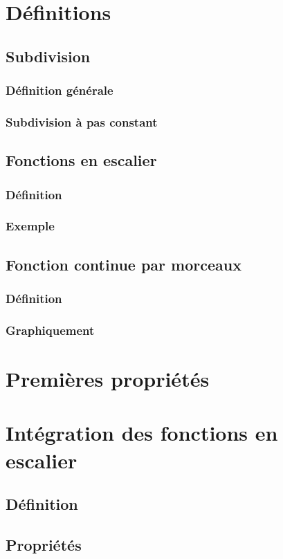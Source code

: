 \documentclass[12pt,a4paper,french]{book}
\begin{document}
	\section{Définitions}
		\subsection{Subdivision}
			\subsubsection{Définition générale}
			\subsubsection{Subdivision à pas constant}
		\subsection{Fonctions en escalier}
			\subsubsection{Définition}
			\subsubsection{Exemple}
		\subsection{Fonction continue par morceaux}
			\subsubsection{Définition}
			\subsubsection{Graphiquement}
	\section{Premières propriétés}
	\section{Intégration des fonctions en escalier}
		\subsection{Définition}
		\subsection{Propriétés}
\end{document}
